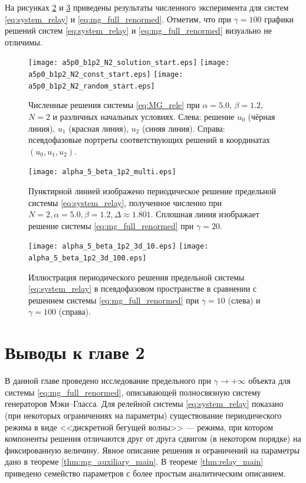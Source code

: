 На рисунках \ref{fig:solution_2d} и \ref{fig:solution_3d} приведены результаты численного эксперимента для систем \eqref{eq:system_relay} и \eqref{eq:mg_full_renormed}. Отметим, что при $\gamma=100$ графики решений систем \eqref{eq:system_relay} и \eqref{eq:mg_full_renormed} визуально не отличимы.


\begin{figure}[!ht]
	\centering
	\texttt{[image: a5p0\_b1p2\_N2\_solution\_start.eps]}
	\texttt{[image: a5p0\_b1p2\_N2\_const\_start.eps]}
	\texttt{[image: a5p0\_b1p2\_N2\_random\_start.eps]}
	\caption{Численные решения системы \eqref{eq:MG_rele} при  $\alpha = 5.0$, $\beta = 1.2$, $N = 2$ и различных начальных условиях. Слева: решение $u_0$ (чёрная линия), $u_1$ (красная линия), $u_2$ (синяя линия). Справа: псевдофазовые портреты соответствующих решений в координатах $(u_0, u_1, u_2)$.}
	\label{fig:periodic_solution}
\end{figure}

\begin{figure}
	\centering
	\texttt{[image: alpha\_5\_beta\_1p2\_multi.eps]}
	\caption{Пунктирной линией изображено периодическое решение предельной системы  \eqref{eq:system_relay}, полученное численно при $N = 2, \alpha = 5.0, \beta = 1.2, \Delta \approx 1.801$. Сплошная линия изображает решение системы \eqref{eq:mg_full_renormed} при $\gamma = 20$.}
	\label{fig:solution_2d}
\end{figure}

\begin{figure}
	\centering
	\texttt{[image: alpha\_5\_beta\_1p2\_3d\_10.eps]}\hfill
	\texttt{[image: alpha\_5\_beta\_1p2\_3d\_100.eps]}
	\caption{Иллюстрация периодического решения предельной системы \eqref{eq:system_relay} в псевдофазовом пространстве в сравнении с решением системы \eqref{eq:mg_full_renormed} при $\gamma = 10$ (слева) и $\gamma = 100$ (справа).}
	\label{fig:solution_3d}
\end{figure}


\section{Выводы к главе 2}\label{sec:ch2/sect5}

В данной главе проведено исследование предельного при $\gamma \to +\infty$ объекта для системы \eqref{eq:mg_full_renormed}, описывающей полносвязную систему генераторов Мэки--Гласса. Для релейной системы \eqref{eq:system_relay} показано (при некоторых ограничениях на параметры) существование периодического режима в виде <<дискретной бегущей волны>> --- режима, при котором компоненты решения отличаются друг от друга сдвигом (в некотором порядке) на фиксированную величину. Явное описание решения и ограничений на параметры дано в теореме \ref{thm:mg_auxiliary_main}. В теореме \ref{thm:relay_main} приведено семейство параметров с более простым аналитическим описанием.

